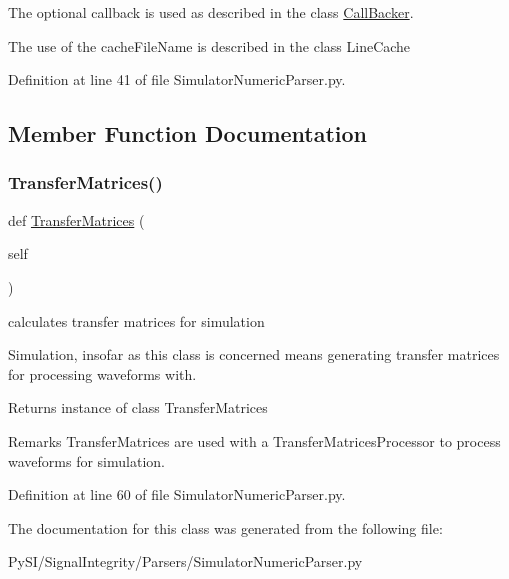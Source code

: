 The optional callback is used as described in the class \hyperlink{namespaceSignalIntegrity_1_1CallBacker}{Call\+Backer}.

The use of the cache\+File\+Name is described in the class Line\+Cache 

Definition at line 41 of file Simulator\+Numeric\+Parser.\+py.



\subsection{Member Function Documentation}
\mbox{\label{classSignalIntegrity_1_1Parsers_1_1SimulatorNumericParser_1_1SimulatorNumericParser_a836e87421e9e21a6676da06625b644b1}} 
\subsubsection{\texorpdfstring{Transfer\+Matrices()}{TransferMatrices()}}
{\footnotesize\ttfamily def \hyperlink{classSignalIntegrity_1_1FrequencyDomain_1_1TransferMatrices_1_1TransferMatrices}{Transfer\+Matrices} (\begin{DoxyParamCaption}\item[{}]{self }\end{DoxyParamCaption})}



calculates transfer matrices for simulation 

Simulation, insofar as this class is concerned means generating transfer matrices for processing waveforms with.

\begin{DoxyReturn}{Returns}
instance of class Transfer\+Matrices
\end{DoxyReturn}
\begin{DoxyRemark}{Remarks}
Transfer\+Matrices are used with a Transfer\+Matrices\+Processor to process waveforms for simulation. 
\end{DoxyRemark}


Definition at line 60 of file Simulator\+Numeric\+Parser.\+py.



The documentation for this class was generated from the following file\+:\begin{DoxyCompactItemize}
\item 
Py\+S\+I/\+Signal\+Integrity/\+Parsers/Simulator\+Numeric\+Parser.\+py\end{DoxyCompactItemize}
